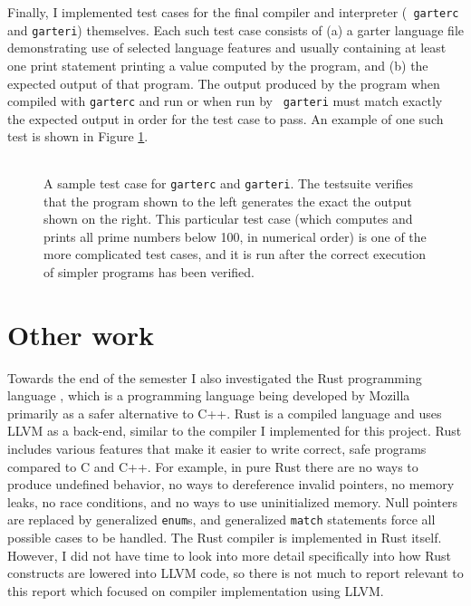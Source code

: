 \documentclass[11pt]{article}
\begin{document}
Finally, I implemented test cases for the final compiler and interpreter ({\tt
garterc} and {\tt garteri}) themselves.  Each such test case consists of (a) a
garter language file demonstrating use of selected language features and usually
containing at least one print statement printing a value computed by the
program, and (b) the expected output of that program.  The output produced by
the program when compiled with {\tt garterc} and run or when run by {\tt
garteri} must match exactly the expected output in order for the test case to
pass.  An example of one such test is shown in Figure \ref{fig:garterc_test}.

\begin{figure}
    \begin{tabular}{|p{9cm}|p{4cm}|}
    \hline
    
    &
    
    \\ \hline
    \end{tabular}
    \caption{A sample test case for {\tt garterc} and {\tt garteri}.  The
        testsuite verifies that the program shown to the left generates the exact
        the output shown on the right.  This particular test case (which
        computes and prints all prime numbers below 100, in numerical order) is
        one of the more complicated test cases, and it is run after the correct
    execution of simpler programs has been verified.  }
    \label{fig:garterc_test}
\end{figure}

\section{Other work}

Towards the end of the semester I also investigated the Rust programming
language \cite{rust}, which is a programming language being developed by Mozilla
primarily as a safer alternative to C++.  Rust is a compiled language and uses
LLVM as a back-end, similar to the compiler I implemented for this project.
Rust includes various features that make it easier to write correct, safe
programs compared to C and C++.  For example, in pure Rust there are no ways to
produce undefined behavior, no ways to dereference invalid pointers, no memory
leaks, no race conditions, and no ways to use uninitialized memory.  Null
pointers are replaced by generalized {\tt enum}s, and generalized {\tt match}
statements force all possible cases to be handled.  The Rust compiler is
implemented in Rust itself.  However, I did not have time to look into more
detail specifically into how Rust constructs are lowered into LLVM code, so
there is not much to report relevant to this report which focused on compiler
implementation using LLVM.



\end{document}
